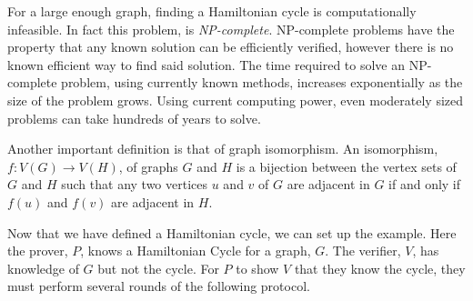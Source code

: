 \documentclass{sig-alternate}
\begin{document}
	For a large enough
	graph, finding a Hamiltonian cycle is computationally infeasible. In fact this 
	problem, is \textit{NP-complete}. NP-complete problems have the property that
	any known solution can be efficiently verified, however there is no known
	efficient way to find said solution. The time required to solve an 
	NP-complete problem, using currently known methods, increases exponentially 
	as the size of the problem grows. Using current computing power, even moderately 
	sized problems can take 	hundreds of years to solve.
	
	Another important definition is that of graph isomorphism. An
	isomorphism, $f:V(G) \rightarrow V(H)$, of graphs $G$ and $H$ is a 
	bijection between the vertex
	sets of $G$ and $H$ such that any two vertices $u$ and $v$ of $G$ are
	adjacent in $G$ if and only if $f(u)$ and $f(v)$ are adjacent in $H$.
		
	Now that we have defined a Hamiltonian cycle, we can set up the example.
	Here the prover, $P$, knows a Hamiltonian Cycle for a graph, $G$. The
	verifier, $V$, has knowledge of $G$ but not the cycle. For $P$ to show
	$V$ that they know the cycle, they must perform several rounds of the 
	following protocol.
	
\end{document}
